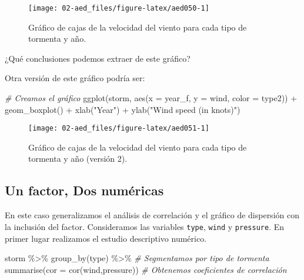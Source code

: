 \documentclass[
]{book}
\newenvironment{Shaded}{\begin{snugshade}}{\end{snugshade}}
\newcommand{\AttributeTok}[1]{\textcolor[rgb]{0.77,0.63,0.00}{#1}}
\newcommand{\CommentTok}[1]{\textcolor[rgb]{0.56,0.35,0.01}{\textit{#1}}}
\newcommand{\FunctionTok}[1]{\textcolor[rgb]{0.00,0.00,0.00}{#1}}
\newcommand{\NormalTok}[1]{#1}
\newcommand{\SpecialCharTok}[1]{\textcolor[rgb]{0.00,0.00,0.00}{#1}}
\newcommand{\StringTok}[1]{\textcolor[rgb]{0.31,0.60,0.02}{#1}}
\begin{document}
\begin{figure}

{\centering \texttt{[image: 02-aed\_files/figure-latex/aed050-1]} 

}

\caption{Gráfico de cajas de la velocidad del viento para cada tipo de tormenta y año.}\label{fig:aed050}
\end{figure}

¿Qué conclusiones podemos extraer de este gráfico?

Otra versión de este gráfico podría ser:

\begin{Shaded}
\begin{Highlighting}[]
\CommentTok{\# Creamos el gráfico}
\FunctionTok{ggplot}\NormalTok{(storm, }\FunctionTok{aes}\NormalTok{(}\AttributeTok{x =}\NormalTok{ year\_f, }\AttributeTok{y =}\NormalTok{ wind, }\AttributeTok{color =}\NormalTok{ type2))  }\SpecialCharTok{+}
  \FunctionTok{geom\_boxplot}\NormalTok{() }\SpecialCharTok{+} 
  \FunctionTok{xlab}\NormalTok{(}\StringTok{"Year"}\NormalTok{) }\SpecialCharTok{+}
  \FunctionTok{ylab}\NormalTok{(}\StringTok{"Wind speed (in knots)"}\NormalTok{) }
\end{Highlighting}
\end{Shaded}

\begin{figure}

{\centering \texttt{[image: 02-aed\_files/figure-latex/aed051-1]} 

}

\caption{Gráfico de cajas de la velocidad del viento para cada tipo de tormenta y año (versión 2).}\label{fig:aed051}
\end{figure}

\hypertarget{un-factor-dos-numuxe9ricas}{%
\subsection{Un factor, Dos numéricas}\label{un-factor-dos-numuxe9ricas}}

En este caso generalizamos el análisis de correlación y el gráfico de dispersión con la inclusión del factor. Consideramos las variables \texttt{type}, \texttt{wind} y \texttt{pressure}. En primer lugar realizamos el estudio descriptivo numérico.

\begin{Shaded}
\begin{Highlighting}[]
\NormalTok{storm }\SpecialCharTok{\%\textgreater{}\%} 
  \FunctionTok{group\_by}\NormalTok{(type) }\SpecialCharTok{\%\textgreater{}\%} \CommentTok{\# Segmentamos por tipo de tormenta}
  \FunctionTok{summarise}\NormalTok{(}\AttributeTok{cor =} \FunctionTok{cor}\NormalTok{(wind,pressure)) }\CommentTok{\# Obtenemos coeficientes de correlación}
\end{Highlighting}
\end{Shaded}
\end{document}
